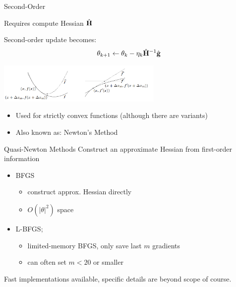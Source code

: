 \documentclass{beamer}
\begin{document}
\begin{frame}{Second-Order}

  Requires  compute Hessian $\hat{\mathbf{H}}$ 

   Second-order update becomes:
  \[\theta_{k+1} \gets \theta_{k} - \eta_k \hat{\mathbf{H}}^{-1} \hat{\mathbf{g}} \]


  \begin{center}
    \includegraphics[width=8cm]{newton}
  \end{center}
  \begin{itemize}
  \item Used for strictly convex functions (although there are variants)
  \item Also known as: Newton's Method
  \end{itemize}

\end{frame}




\begin{frame}{Quasi-Newton Methods  }
  Construct an approximate Hessian from  first-order information
  \begin{itemize}
  \item BFGS 
    \begin{itemize}
    \item construct approx. Hessian directly
    \item $O(|\theta|^2)$ space
    \end{itemize}

  \item L-BFGS; 
    \begin{itemize}
    \item limited-memory BFGS, only save last $m$ gradients
    \item can often set $m <20$ or smaller
    \end{itemize}
  \end{itemize}
  
  Fast implementations available, specific details are beyond scope of course.

\end{frame}
\end{document}
